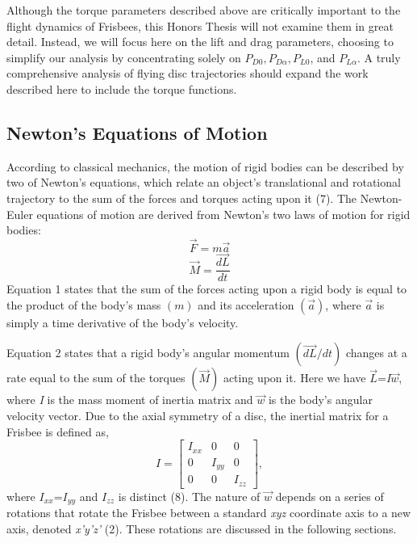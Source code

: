 \documentclass[a4paper,12pt, oneside]{article}
\begin{document}
Although the torque parameters described above are critically important to the flight dynamics of Frisbees, this Honors Thesis will not examine them in great detail. Instead, we will focus here on the lift and drag parameters, choosing to simplify our analysis by concentrating solely on $P_{D0}, P_{D\alpha}, P_{L0}$, and $P_{L\alpha}$. A truly comprehensive analysis of flying disc trajectories should expand the work described here to include the torque functions.

\subsection{Newton's Equations of Motion} 

According to classical mechanics, the motion of rigid bodies can be described by two of Newton's equations, which relate an object's translational and rotational trajectory to the sum of the forces and torques acting upon it (7).  The Newton-Euler equations of motion are derived from Newton's two laws of motion for rigid bodies:
\begin{equation}
\vec{F}=\textit{m}\vec{a}
\end{equation}
\begin{equation}
\vec{M}=\dfrac{\vec{dL}}{dt}
\end{equation}
Equation 1 states that the sum of the forces acting upon a rigid body is equal to the product of the body's mass $(\textit{m})$ and its acceleration $(\vec{a})$, where $\vec{a}$ is simply a time derivative of the body's velocity.  

Equation 2 states that a rigid body's angular momentum $(\vec{dL}/dt)$ changes at a rate equal to the sum of the torques $(\vec{M})$ acting upon it. Here we have $\vec{L}$=\textit{I}$\vec{w}$, where \textit{I} is the mass moment of inertia matrix and $\vec{w}$ is the body's angular velocity vector. Due to the axial symmetry of a disc, the inertial matrix for a Frisbee is defined as,  
\begin{equation*}
I=\begin{bmatrix}
I_{xx} & 0 & 0 \\
0 & I_{yy} & 0 \\ 
0 & 0 & I_{zz}
\end{bmatrix},
\end{equation*}
where $I_{xx}$=$I_{yy}$ and $I_{zz}$ is distinct (8).  The nature of $\vec{w}$ depends on a series of rotations that rotate the Frisbee between a standard \textit{xyz} coordinate axis to a new axis, denoted \textit{x'y'z'} (2). These rotations are discussed in the following sections.
\end{document}
